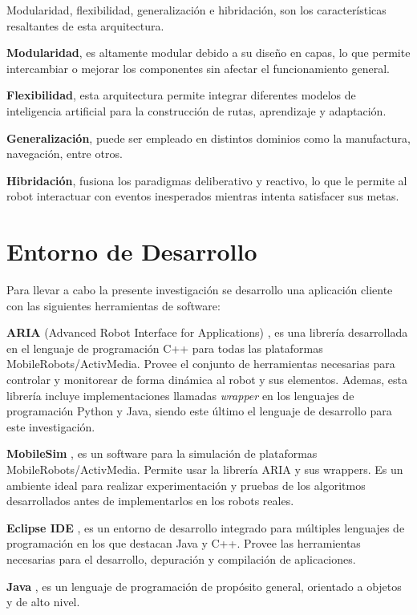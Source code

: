 \documentclass[11pt,twoside,A5]{article}
\begin{document}
Modularidad, flexibilidad, generalización e hibridación, son los características resaltantes de esta arquitectura.

\textbf{Modularidad}, es altamente modular debido a su diseño en capas, lo que permite intercambiar o mejorar
los componentes sin afectar el funcionamiento general.

\textbf{Flexibilidad}, esta arquitectura permite integrar diferentes modelos de inteligencia artificial 
para la construcción de rutas, aprendizaje y adaptación. 

\textbf{Generalización}, puede ser empleado en distintos dominios como la manufactura, navegación, entre otros.

\textbf{Hibridación}, fusiona los paradigmas deliberativo y reactivo, lo que le permite al robot interactuar con eventos inesperados mientras intenta satisfacer sus metas.

\section*{Entorno de Desarrollo}

Para llevar a cabo la presente investigación se desarrollo una aplicación cliente
con las siguientes herramientas de software:

\textbf{ARIA} (Advanced Robot Interface for Applications) \cite{aria2014},
es una librería desarrollada en el lenguaje de programación C++ para todas las
plataformas MobileRobots/ActivMedia. Provee el conjunto de herramientas necesarias
para controlar y monitorear de forma dinámica al robot y sus elementos. Ademas, esta librería
incluye implementaciones llamadas \textit{wrapper} en los lenguajes de programación Python y Java, siendo este último 
el lenguaje de desarrollo para este investigación.

\textbf{MobileSim} \cite{mobilesim2014}, es un software para la simulación de plataformas
MobileRobots/ActivMedia. Permite usar la librería ARIA y sus wrappers. Es un ambiente
ideal para realizar experimentación y pruebas de los algoritmos desarrollados antes de
implementarlos en los robots reales.
 
\textbf{Eclipse IDE} \cite{eclipse2014}, es un entorno de desarrollo integrado para múltiples lenguajes de 
programación en los que destacan Java y C++. Provee las herramientas necesarias para el desarrollo, depuración  
y compilación de aplicaciones.

\textbf{Java} \cite{java2014}, es un lenguaje de programación de propósito general, orientado a objetos y de alto nivel. 
 
\end{document}
